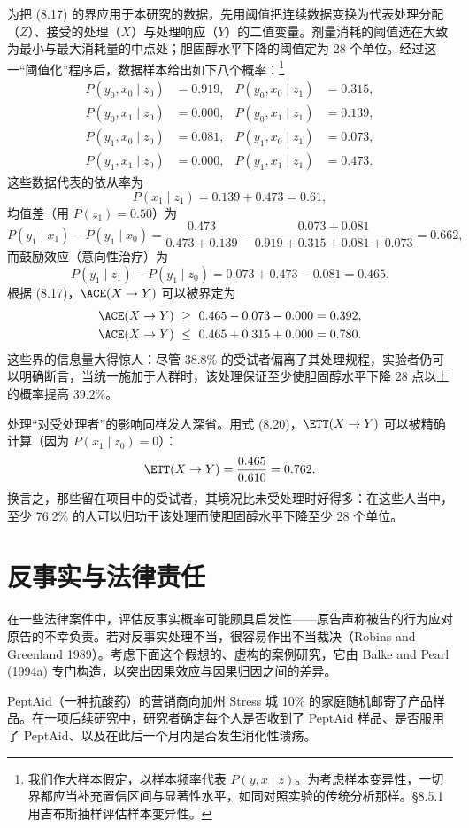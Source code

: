 为把 \textup{(8.17)} 的界应用于本研究的数据，先用阈值把连续数据变换为代表处理分配（$Z$）、接受的处理（$X$）与处理响应（$Y$）的二值变量。剂量消耗的阈值选在大致为最小与最大消耗量的中点处；胆固醇水平下降的阈值定为 28 个单位。经过这一“阈值化”程序后，数据样本给出如下八个概率：\footnote{我们作大样本假定，以样本频率代表 $P(y,x\mid z)$。为考虑样本变异性，一切界都应当补充置信区间与显著性水平，如同对照实验的传统分析那样。\S 8.5.1 用吉布斯抽样评估样本变异性。}
\begin{align*}
P(y_0,x_0\mid z_0)&=0.919, & P(y_0,x_0\mid z_1)&=0.315,\\
P(y_0,x_1\mid z_0)&=0.000, & P(y_0,x_1\mid z_1)&=0.139,\\
P(y_1,x_0\mid z_0)&=0.081, & P(y_1,x_0\mid z_1)&=0.073,\\
P(y_1,x_1\mid z_0)&=0.000, & P(y_1,x_1\mid z_1)&=0.473.
\end{align*}
这些数据代表的依从率为
\[
P(x_1\mid z_1)=0.139+0.473=0.61,
\]
均值差（用 $P(z_1)=0.50$）为
\[
P(y_1\mid x_1)-P(y_1\mid x_0)=\frac{0.473}{0.473+0.139}-\frac{0.073+0.081}{0.919+0.315+0.081+0.073}=0.662,
\]
而鼓励效应（意向性治疗）为
\[
P(y_1\mid z_1)-P(y_1\mid z_0)=0.073+0.473-0.081=0.465.
\]
根据 \textup{(8.17)}，$\ACE(X\to Y)$ 可以被界定为
\[
\begin{aligned}
\ACE(X\to Y)&\ \ge\ 0.465-0.073-0.000=0.392,\\
\ACE(X\to Y)&\ \le\ 0.465+0.315+0.000=0.780.
\end{aligned}
\]
这些界的信息量大得惊人：尽管 38.8\% 的受试者偏离了其处理规程，实验者仍可以明确断言，当统一施加于人群时，该处理保证至少使胆固醇水平下降 28 点以上的概率提高 39.2\%。

处理“对受处理者”的影响同样发人深省。用式 \textup{(8.20)}，$\ETT(X\to Y)$ 可以被精确计算（因为 $P(x_1\mid z_0)=0$）：
\[
\ETT(X\to Y)=\frac{0.465}{0.610}=0.762.
\]
换言之，那些留在项目中的受试者，其境况比未受处理时好得多：在这些人当中，至少 76.2\% 的人可以归功于该处理而使胆固醇水平下降至少 28 个单位。

\section{反事实与法律责任}

在一些法律案件中，评估反事实概率可能颇具启发性——原告声称被告的行为应对原告的不幸负责。若对反事实处理不当，很容易作出不当裁决（Robins and Greenland 1989）。考虑下面这个假想的、虚构的案例研究，它由 Balke and Pearl (1994a) 专门构造，以突出因果效应与因果归因之间的差异。

PeptAid（一种抗酸药）的营销商向加州 Stress 城 10\% 的家庭随机邮寄了产品样品。在一项后续研究中，研究者确定每个人是否收到了 PeptAid 样品、是否服用了 PeptAid、以及在此后一个月内是否发生消化性溃疡。

